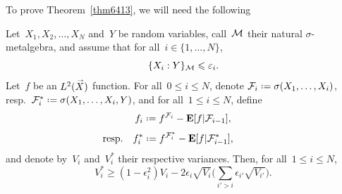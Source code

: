 To prove Theorem~\ref{thm6413},
we will need the following
%
\begin{Lem}\label{lem7265}
Let~$X_1,X_2,\ldots,X_N$ and~$Y$ be random variables,
call~$\mathcal{M}$ their natural $\sigma$-metalgebra,
and assume that for all~$i\in\{1,\ldots,N\}$,
\[ \{X_i:Y\}_{\mathcal{M}} \leqslant \varepsilon_i .\]
Let~$f$ be an $\ldb(\vec{X})$ function.
For all~$0 \leq i \leq N$, denote $\mcal{F}_i \coloneqq \sigma(X_1,\ldots,X_i)$,
resp.\ $\mcal{F}^*_i \coloneqq \sigma(X_1,\ldots,\ab X_i,Y)$,
and for all~$1 \leq i \leq N$, define
\[ f_i \coloneqq f^{\mcal{F}_i} - \EE[f|\mcal{F}_{i-1}] ,\]
\[ \llap{\text{resp.}\quad} f^*_i \coloneqq f^{\mcal{F}^*_i} - \EE[f|\mcal{F}^*_{i-1}] ,\]
and denote by~$V_i$ and~$V^*_i$ their respective variances. Then,
for all~$1 \leq i \leq N$,
\[\label{for1302}
V^*_i \geq (1-\epsilon_i^2) V_i - 2\epsilon_i \sqrt{V_i} \Big( \sum_{i'>i} \epsilon_{i'} \sqrt{V_{i'}} \Big) .\]
\end{Lem}

